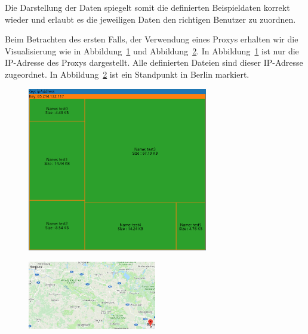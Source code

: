 \documentclass[
    fontsize=12pt,
    headings=small,
    parskip=half,           %
    bibliography=totoc,
    numbers=noenddot,       %
    open=any,               %
    ]{scrreprt}
\begin{document}
Die Darstellung der Daten spiegelt somit die definierten Beispieldaten korrekt wieder und erlaubt es die jeweiligen Daten den richtigen Benutzer zu zuordnen.


Beim Betrachten des ersten Falls, der Verwendung eines Proxys erhalten wir die Visualisierung wie in Abbildung~\ref{fig:PIpTM} und Abbildung~\ref{fig:PIpM}.
In Abbildung~\ref{fig:PIpTM} ist nur die IP-Adresse des Proxys dargestellt.
Alle definierten Dateien sind dieser IP-Adresse zugeordnet. 
In Abbildung~\ref{fig:PIpM} ist ein Standpunkt in Berlin markiert.

\begin{figure}[H]
\includegraphics[width=0.7\textwidth]{../pic/IP-Proxy-SetB-tree2.PNG}
\label{fig:PIpTM}
\end{figure}

\begin{figure}[H]
\includegraphics[width=0.5\textwidth , height=0.2\textheight]{../pic/IP-Proxy-SetB.PNG}
\label{fig:PIpM}
\end{figure}
\end{document}
